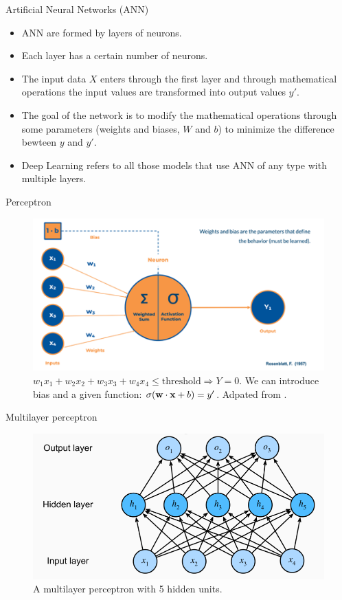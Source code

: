 \documentclass{beamer}
\begin{document}
\begin{frame}{Artificial Neural Networks (ANN)}
    \begin{itemize}
        \item ANN are formed by layers of neurons.
        \item Each layer has a certain number of neurons.
        \item The input data $X$ enters through the first layer and through mathematical operations the input values are transformed into output values $y'$.
        \item The goal of the network is to modify the mathematical operations through some parameters (weights and biases, $W$ and $b$) to minimize the difference bewteen $y$ and $y'$.
        \item Deep Learning refers to all those models that use ANN of any type with multiple layers.
    \end{itemize}
\end{frame}



\begin{frame}{Perceptron}
    \begin{figure}
        \includegraphics[width=0.9\linewidth]{perceptron}
        \caption{$w_1 x_1 + w_2 x_2 +w_3x_3+w_4x_4 \leq \mathrm{threshold} \Rightarrow Y=0$. We can introduce bias and a given function: $\sigma(\textbf{w}\cdot \textbf{x}+b)=y'$. Adpated from \cite{rosenblatt_perceptron_1958}.}
        \label{Fig:perceptron}
    \end{figure}
\end{frame}

\begin{frame}{Multilayer perceptron}
    \begin{figure}
        \includegraphics[width=0.9\linewidth]{MLP}
        \caption{A multilayer perceptron with 5 hidden units.}
        \label{Fig:perceptron}
    \end{figure}
\end{frame}
\end{document}
